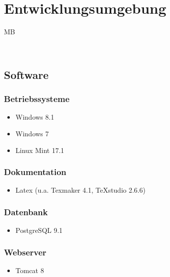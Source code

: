 \documentclass[a4paper]{scrreprt}
\begin{document}
\chapter{Entwicklungsumgebung}
\begin{tiny}
		MB
	\end{tiny}\\

    \section{Software}
        \subsection{Betriebssysteme}
            \begin{itemize}
            	\item Windows 8.1
            	\item Windows 7
            	\item Linux Mint 17.1
            \end{itemize}	
            
        \subsection{Dokumentation}
            \begin{itemize}
            	\item Latex (u.a. Texmaker 4.1, TeXstudio 2.6.6)
            \end{itemize}
            
        \subsection{Datenbank}
           \begin{itemize}
           	\item PostgreSQL 9.1
           \end{itemize}
           
        \subsection{Webserver}
            \begin{itemize}
            	\item Tomcat 8
            \end{itemize}
            
\end{document}
